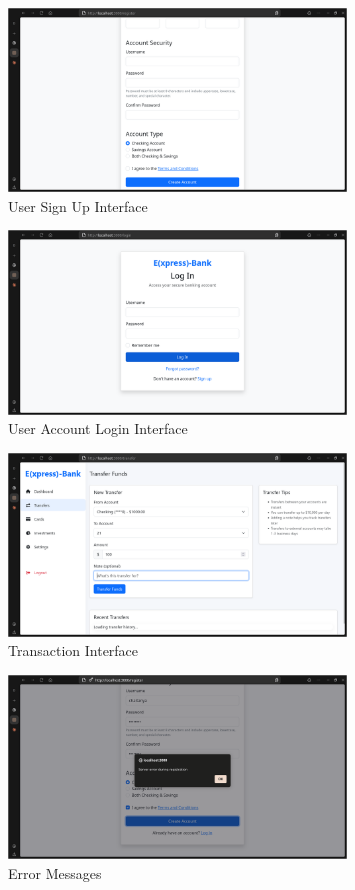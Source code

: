 \begin{figure}[h]
    \centering
    \includegraphics[width=0.8\textwidth]{register.png}
    \caption{User Sign Up Interface}
\end{figure}

\begin{figure}[h]
    \centering
    \includegraphics[width=0.8\textwidth]{login.png}
    \caption{User Account Login Interface}
\end{figure}

\begin{figure}[h]
    \centering
    \includegraphics[width=0.8\textwidth]{transfers.png}
    \caption{Transaction Interface}
\end{figure}

\begin{figure}[h]
    \centering
    \includegraphics[width=0.8\textwidth]{error.png}
    \caption{Error Messages}
\end{figure}

